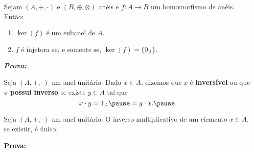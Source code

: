 \documentclass{beamer}
\begin{document}
    \begin{frame}
        \begin{proposicao}
            Sejam $(A, +, \cdot)$ e $(B, \oplus, \otimes)$ an\'eis \pause e $f : A \to B$ um homomorfismo de an\'eis. \pause Ent\~ao:\pause
            \begin{enumerate}[label={\roman*})]
                \item $\ker(f)$ \'e um subanel de $A$.\pause

                \vspace{.5cm}

                \item $f$ \'e injetora \pause se, e somente se, \pause $\ker(f) = \{0_A\}$.\pause

                \vspace{.5cm}
            \end{enumerate}
        \end{proposicao}
    \end{frame}

    \begin{frame}
        \noindent \textbf{\textit{Prova: }}

        \vspace{6.5cm}
    \end{frame}

    \begin{frame}
        \begin{definicao}
            Seja $(A, +, \cdot)$ um anel unitário. \pause Dado $x \in A$, \pause dizemos que $x$ é \textbf{inversível} \pause ou que $x$ \textbf{possui inverso} \pause se existe $y \in A$ \pause tal que\pause
            \[
                x \cdot y = 1_A \pause = y \cdot x.\pause
            \]
        \end{definicao}
    \end{frame}

    \begin{frame}
        \begin{proposicao}
            Seja $(A, +, \cdot)$ um anel unitário. \pause O inverso multiplicativo de um elemento $x \in A$, \pause se existir, \pause é único.\pause
        \end{proposicao}
    
        \noindent \textbf{Prova:}
        \vspace{4.7cm}
    \end{frame}
\end{document}
